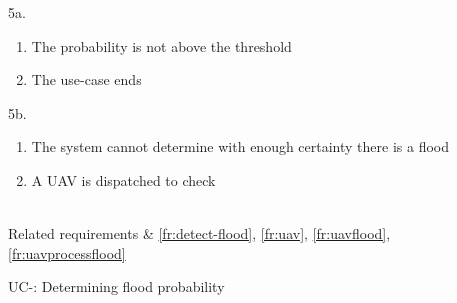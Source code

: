 \begin{appendices}
\begin{table}[H]
{{			\item[5a.] 
			\begin{enumerate}
			  \item The probability is not above the threshold
			  \item The use-case ends
			\end{enumerate}
			\item[5b.]
			\begin{enumerate}
			  \item The system cannot determine with enough certainty there is a flood
			  \item A UAV is dispatched to check
			\end{enumerate}
			}\\
		Related requirements & \ref{fr:detect-flood}, \ref{fr:uav}, \ref{fr:uavflood}, \ref{fr:uavprocessflood} \\
	}
	\caption{UC-: Determining flood probability}
	\label{table:uc-determine-flood-probability}
	\end{table}

	\clearpage

\end{appendices}
